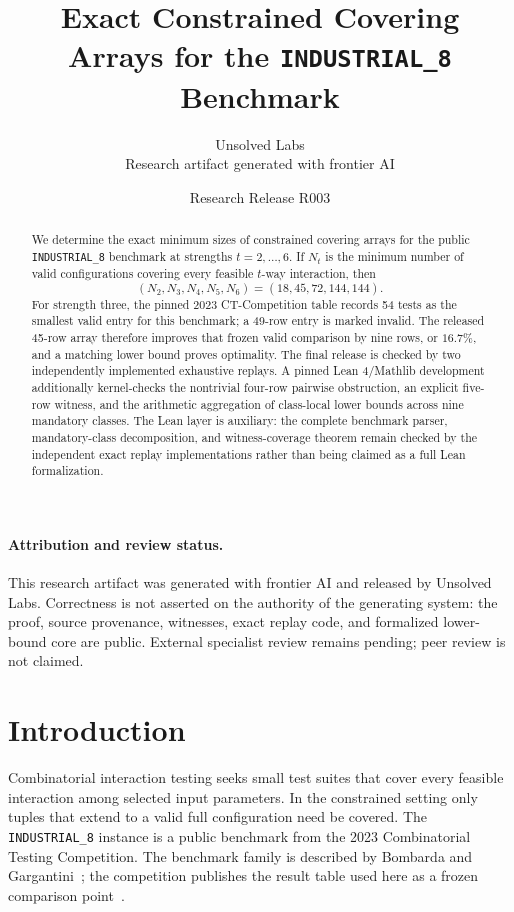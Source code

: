 \documentclass[11pt]{article}
\title{Exact Constrained Covering Arrays for the \texttt{INDUSTRIAL\_8} Benchmark}
\author{Unsolved Labs\\\small Research artifact generated with frontier AI}
\date{Research Release R003}
\begin{document}
\maketitle

\begin{abstract}
We determine the exact minimum sizes of constrained covering arrays for the
public \texttt{INDUSTRIAL\_8} benchmark at strengths $t=2,\ldots,6$.
If $N_t$ is the minimum number of valid configurations covering every feasible
$t$-way interaction, then
\[
(N_2,N_3,N_4,N_5,N_6)=(18,45,72,144,144).
\]
For strength three, the pinned 2023 CT-Competition table records 54 tests as
the smallest valid entry for this benchmark; a 49-row entry is marked invalid.
The released 45-row array therefore improves that frozen valid comparison by
nine rows, or $16.7\%$, and a matching lower bound proves optimality.
The final release is checked by two independently implemented exhaustive
replays. A pinned Lean 4/Mathlib development additionally kernel-checks the
nontrivial four-row pairwise obstruction, an explicit five-row witness, and the
arithmetic aggregation of class-local lower bounds across nine mandatory
classes. The Lean layer is auxiliary: the complete benchmark parser,
mandatory-class decomposition, and witness-coverage theorem remain checked by
the independent exact replay implementations rather than being claimed as a
full Lean formalization.
\end{abstract}

\paragraph{Attribution and review status.}
This research artifact was generated with frontier AI and released by Unsolved
Labs. Correctness is not asserted on the authority of the generating system:
the proof, source provenance, witnesses, exact replay code, and formalized
lower-bound core are public. External specialist review remains pending; peer
review is not claimed.

\section{Introduction}
Combinatorial interaction testing seeks small test suites that cover every
feasible interaction among selected input parameters. In the constrained
setting only tuples that extend to a valid full configuration need be covered.
The \texttt{INDUSTRIAL\_8} instance is a public benchmark from the 2023
Combinatorial Testing Competition. The benchmark family is described by
Bombarda and Gargantini~\cite{bombarda2024}; the competition publishes the
result table used here as a frozen comparison point~\cite{ctcompetition2023}.
\end{document}
